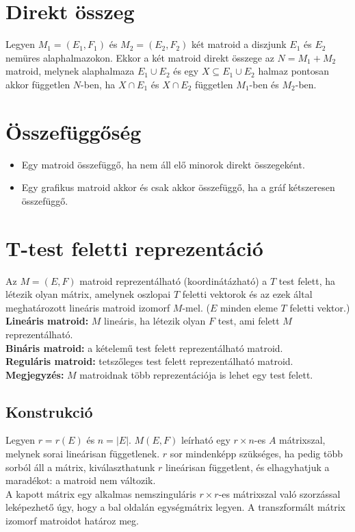 \section*{Direkt összeg}
Legyen $M_{1}=(E_{1},F_{1})$ és $M_{2}=(E_{2},F_{2})$ két matroid a diszjunk $E_{1}$ és $E_{2}$ nemüres alaphalmazokon. Ekkor a két matroid direkt összege az $N=M_{1}+M_{2}$ matroid, melynek alaphalmaza $E_{1}\cup E_{2}$ és egy $X\subseteq E_{1}\cup E_{2}$ halmaz pontosan akkor független $N$-ben, ha $X\cap E_{1}$ és $X\cap E_{2}$ független $M_{1}$-ben és $M_{2}$-ben. 

\section*{Összefüggőség}
\begin{itemize}
\item Egy matroid összefüggő, ha nem áll elő minorok direkt összegeként.
\item Egy grafikus matroid akkor és csak akkor összefüggő, ha a gráf kétszeresen összefüggő.
\end{itemize}

\section*{T-test feletti reprezentáció}
Az $M=(E,F)$ matroid reprezentálható (koordinátázható) a $T$ test felett, ha létezik olyan mátrix, amelynek oszlopai $T$ feletti vektorok és az ezek által meghatározott lineáris matroid izomorf $M$-mel. ($E$ minden eleme $T$ feletti vektor.)\\
\newline
\noindent
\textbf{Lineáris matroid:} $M$ lineáris, ha létezik olyan $F$ test, ami felett $M$ reprezentálható.\\
\textbf{Bináris matroid:} a kételemű test felett reprezentálható matroid.\\
\textbf{Reguláris matroid:} tetszőleges test felett reprezentálható matroid.\\
\newline
\textbf{Megjegyzés:} $M$ matroidnak több reprezentációja is lehet egy test felett.

\subsection*{Konstrukció}
Legyen $r=r(E)$ és $n=|E|$. $M(E,F)$ leírható egy $r\times n$-es $A$ mátrixszal, melynek sorai lineárisan függetlenek. $r$ sor mindenképp szükséges, ha pedig több sorból áll a mátrix, kiválaszthatunk $r$ lineárisan függetlent, és elhagyhatjuk a maradékot: a matroid nem változik.\\
\newline
A kapott mátrix egy alkalmas nemszinguláris $r\times r$-es mátrixszal való szorzással leképezhető úgy, hogy a bal oldalán egységmátrix legyen. A transzformált mátrix izomorf matroidot határoz meg.

